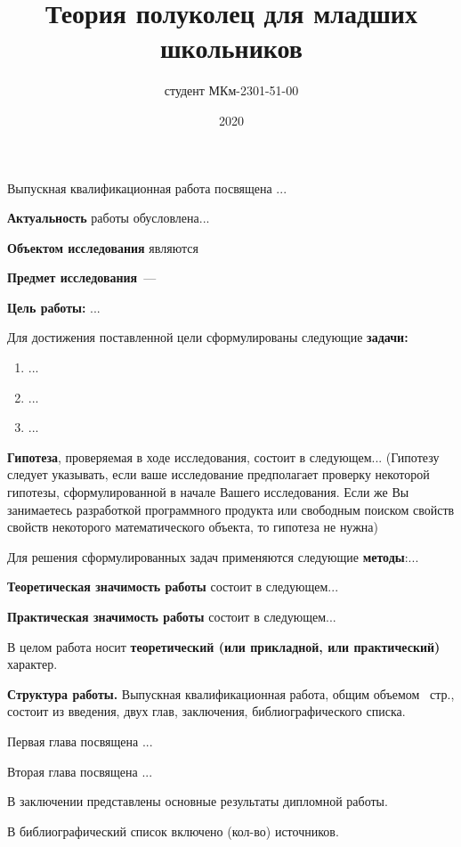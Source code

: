 \documentclass[14pt,Magister]{diplomwork}
\date{2020}
\author{студент МКм-2301-51-00}{Фамилых Имярек Батькович}
\title{Теория полуколец для младших школьников}
\institute{математики и информационных систем}
\begin{document}
	
\maketitle
\makereferat		%
\newpage

\tableofcontents


Выпускная квалификационная работа посвящена ...


\textbf{Актуальность} работы обусловлена...


\textbf{Объектом исследования} являются

\textbf{Предмет исследования}~--- 

\textbf{Цель работы:} ...

Для достижения поставленной цели сформулированы следующие \mbox{\textbf{задачи:}}

\begin{enumerate}
	\item ...
	\item ...
	\item ...
\end{enumerate}

\textbf{Гипотеза}, проверяемая в ходе исследования, состоит в следующем... (Гипотезу следует указывать, если ваше исследование предполагает проверку некоторой гипотезы,  сформулированной в начале Вашего исследования. Если же Вы занимаетесь разработкой программного продукта или свободным поиском свойств свойств некоторого математического объекта, то гипотеза не нужна)


Для решения сформулированных задач  применяются следующие \textbf{методы}:...

\textbf{Теоретическая значимость работы} состоит в следующем...

\textbf{Практическая значимость работы} состоит в следующем...

В целом работа носит \textbf{теоретический (или прикладной, или практический)} характер.



\textbf{Структура работы.} Выпускная квалификационная работа, общим объемом \pageref{LastPage}~стр., состоит из введения, двух глав, заключения, библиографического списка.

Первая глава посвящена ...

Вторая глава посвящена  ...


В заключении представлены основные результаты дипломной работы.

В библиографический список включено (кол-во) источников.
\end{document}

